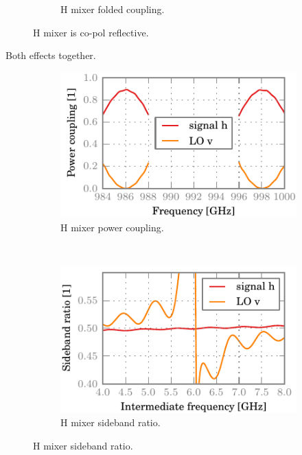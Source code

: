 \begin{figure}[hbtp]
\begin{subfigure}[b]{.5\textwidth}
        \caption{H mixer folded coupling.}
    \end{subfigure}%
    \caption{H mixer is co-pol reflective.}
    \label{fig:04_mh_co}
\end{figure}

Both effects together.
\begin{figure}[hbtp]
    \centering
    \begin{subfigure}[b]{.5\textwidth}
        \includegraphics{chapter_3/05_mh_cocr_h_dsb}%
        \caption{H mixer power coupling.}
    \end{subfigure}%
    \\
    \begin{subfigure}[b]{.5\textwidth}
        \includegraphics{chapter_3/05_mh_cocr_h_sbr}%
        \caption{H mixer sideband ratio.}
    \end{subfigure}%

\end{figure}
